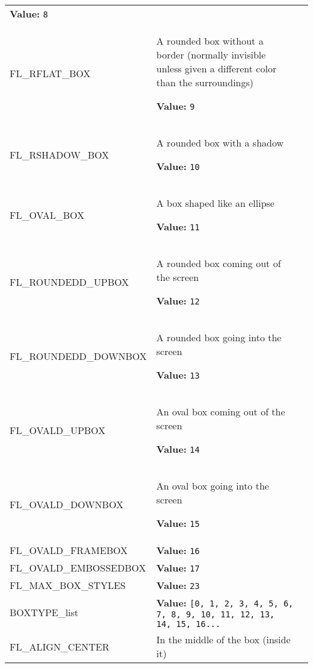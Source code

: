 \begin{longtable}{|p{\varnamewidth}|p{\vardescrwidth}|l}
\textbf{Value:} 
{\tt 8}&\\
\cline{1-2}
\raggedright F\-L\-\_\-R\-F\-L\-A\-T\-\_\-B\-O\-X\- & \raggedright A rounded box without a border (normally invisible unless given a
different color than the surroundings)

\textbf{Value:} 
{\tt 9}&\\
\cline{1-2}
\raggedright F\-L\-\_\-R\-S\-H\-A\-D\-O\-W\-\_\-B\-O\-X\- & \raggedright A rounded box with a shadow

\textbf{Value:} 
{\tt 10}&\\
\cline{1-2}
\raggedright F\-L\-\_\-O\-V\-A\-L\-\_\-B\-O\-X\- & \raggedright A box shaped like an ellipse

\textbf{Value:} 
{\tt 11}&\\
\cline{1-2}
\raggedright F\-L\-\_\-R\-O\-U\-N\-D\-E\-D\-3\-D\-\_\-U\-P\-B\-O\-X\- & \raggedright A rounded box coming out of the screen

\textbf{Value:} 
{\tt 12}&\\
\cline{1-2}
\raggedright F\-L\-\_\-R\-O\-U\-N\-D\-E\-D\-3\-D\-\_\-D\-O\-W\-N\-B\-O\-X\- & \raggedright A rounded box going into the screen

\textbf{Value:} 
{\tt 13}&\\
\cline{1-2}
\raggedright F\-L\-\_\-O\-V\-A\-L\-3\-D\-\_\-U\-P\-B\-O\-X\- & \raggedright An oval box coming out of the screen

\textbf{Value:} 
{\tt 14}&\\
\cline{1-2}
\raggedright F\-L\-\_\-O\-V\-A\-L\-3\-D\-\_\-D\-O\-W\-N\-B\-O\-X\- & \raggedright An oval box going into the screen

\textbf{Value:} 
{\tt 15}&\\
\cline{1-2}
\raggedright F\-L\-\_\-O\-V\-A\-L\-3\-D\-\_\-F\-R\-A\-M\-E\-B\-O\-X\- & \raggedright \textbf{Value:} 
{\tt 16}&\\
\cline{1-2}
\raggedright F\-L\-\_\-O\-V\-A\-L\-3\-D\-\_\-E\-M\-B\-O\-S\-S\-E\-D\-B\-O\-X\- & \raggedright \textbf{Value:} 
{\tt 17}&\\
\cline{1-2}
\raggedright F\-L\-\_\-M\-A\-X\-\_\-B\-O\-X\-\_\-S\-T\-Y\-L\-E\-S\- & \raggedright \textbf{Value:} 
{\tt 23}&\\
\cline{1-2}
\raggedright B\-O\-X\-T\-Y\-P\-E\-\_\-l\-i\-s\-t\- & \raggedright \textbf{Value:} 
{\tt \texttt{[}0\texttt{, }1\texttt{, }2\texttt{, }3\texttt{, }4\texttt{, }5\texttt{, }6\texttt{, }7\texttt{, }8\texttt{, }9\texttt{, }10\texttt{, }11\texttt{, }12\texttt{, }13\texttt{, }14\texttt{, }15\texttt{, }16\texttt{...}}&\\
\cline{1-2}
\raggedright F\-L\-\_\-A\-L\-I\-G\-N\-\_\-C\-E\-N\-T\-E\-R\- & \raggedright In the middle of the box (inside it)


\end{longtable}
